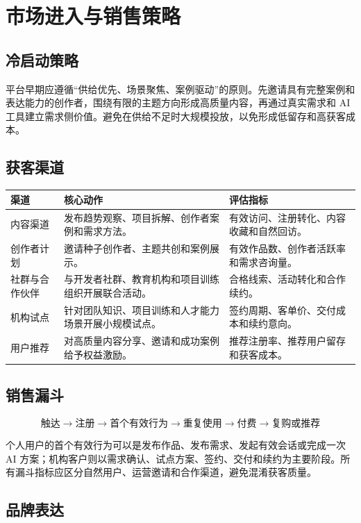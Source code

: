 \documentclass[12pt,a4paper,openany,fontset=fandol]{ctexrep}
\begin{document}
\chapter{市场进入与销售策略}

\section{冷启动策略}

平台早期应遵循“供给优先、场景聚焦、案例驱动”的原则。先邀请具有完整案例和表达能力的创作者，围绕有限的主题方向形成高质量内容，再通过真实需求和 AI 工具建立需求侧价值。避免在供给不足时大规模投放，以免形成低留存和高获客成本。

\section{获客渠道}

\begin{longtable}{p{3cm} p{5.3cm} p{5.4cm}}
\toprule
渠道 & 核心动作 & 评估指标 \\
\midrule
内容渠道 & 发布趋势观察、项目拆解、创作者案例和需求方法。 & 有效访问、注册转化、内容收藏和自然回访。 \\
创作者计划 & 邀请种子创作者、主题共创和案例展示。 & 有效作品数、创作者活跃率和需求咨询量。 \\
社群与合作伙伴 & 与开发者社群、教育机构和项目训练组织开展联合活动。 & 合格线索、活动转化和合作续约。 \\
机构试点 & 针对团队知识、项目训练和人才能力场景开展小规模试点。 & 签约周期、客单价、交付成本和续约意向。 \\
用户推荐 & 对高质量内容分享、邀请和成功案例给予权益激励。 & 推荐注册率、推荐用户留存和获客成本。 \\
\bottomrule
\end{longtable}

\section{销售漏斗}

\[
\text{触达}
\rightarrow
\text{注册}
\rightarrow
\text{首个有效行为}
\rightarrow
\text{重复使用}
\rightarrow
\text{付费}
\rightarrow
\text{复购或推荐}
\]

个人用户的首个有效行为可以是发布作品、发布需求、发起有效会话或完成一次 AI 方案；机构客户则以需求确认、试点方案、签约、交付和续约为主要阶段。所有漏斗指标应区分自然用户、运营邀请和合作渠道，避免混淆获客质量。

\section{品牌表达}
\end{document}
